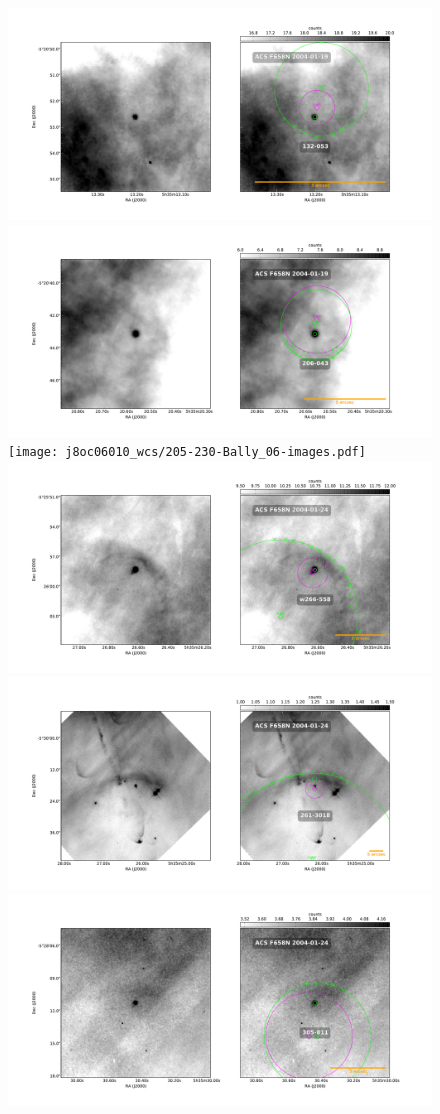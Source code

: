 \documentclass{article}
\begin{document}
\begin{figure}
  \centering
    \includegraphics[width=0.5\linewidth]{j8oc02010_wcs/132-053-Bally_02-images.pdf}
    \includegraphics[width=0.5\linewidth]{j8oc02010_wcs/206-043-Bally_02-images.pdf}
    \texttt{[image: j8oc06010\_wcs/205-230-Bally\_06-images.pdf]}
    \includegraphics[width=0.5\linewidth]{j8oc06010_wcs/w266-558-Bally_06-images.pdf}
    \includegraphics[width=0.5\linewidth]{j8oc07010_wcs/261-3018-Bally_07-images.pdf}
    \includegraphics[width=0.5\linewidth]{j8oc07010_wcs/305-811-Bally_07-images.pdf}
 \label{fig:images}
\end{figure}
\end{document}
